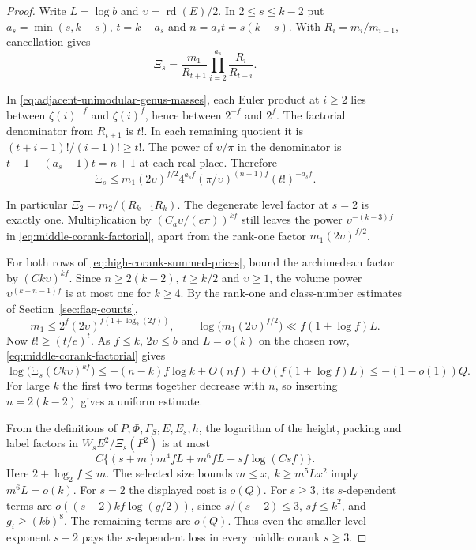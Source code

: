 \begin{proof}
Write \(L=\log b\) and \(\upsilon=\operatorname{rd}(E)/2\). In
\(2\le s\le k-2\) put \(a_s=\min(s,k-s)\), \(t=k-a_s\) and
\(n=a_st=s(k-s)\). With \(R_i=m_i/m_{i-1}\), cancellation gives
\[
 \Xi_s=\frac{m_1}{R_{t+1}}\prod_{i=2}^{a_s}\frac{R_i}{R_{t+i}} .
\]

In \eqref{eq:adjacent-unimodular-genus-masses}, each Euler product
at \(i\ge2\) lies between \(\zeta(i)^{-f}\) and \(\zeta(i)^f\),
hence between \(2^{-f}\) and \(2^f\).
The factorial denominator from \(R_{t+1}\) is \(t!\). In each
remaining quotient it is \((t+i-1)!/(i-1)!\ge t!\).
The power of \(\upsilon/\pi\) in the denominator is
\(t+1+(a_s-1)t=n+1\) at each real place. Therefore
\begin{equation}\label{eq:middle-corank-factorial}
 \Xi_s\le m_1(2\upsilon)^{f/2}4^{a_sf}
               (\pi/\upsilon)^{(n+1)f}(t!)^{-a_sf}.
\end{equation}

In particular \(\Xi_2=m_2/(R_{k-1}R_k)\). The degenerate level
factor at \(s=2\) is exactly one. Multiplication by
\((C_a\upsilon/(e\pi))^{kf}\) still leaves the power
\(\upsilon^{-(k-3)f}\) in \eqref{eq:middle-corank-factorial},
apart from the rank-one factor \(m_1(2\upsilon)^{f/2}\).

For both rows of \eqref{eq:high-corank-summed-prices}, bound the
archimedean factor by \((Ck\upsilon)^{kf}\).
Since \(n\ge2(k-2)\), \(t\ge k/2\) and \(\upsilon\ge1\), the volume
power \(\upsilon^{(k-n-1)f}\) is at most one for \(k\ge4\).
By the rank-one and class-number estimates of
Section~\ref{sec:flag-counts},
\[
 m_1\le2^f(2\upsilon)^{f(1+\log_2(2f))},\qquad
 \log\!\big(m_1(2\upsilon)^{f/2}\big)\ll f(1+\log f)L .
\]
Now \(t!\ge(t/e)^t\). As \(f\le k\), \(2\upsilon\le b\) and
\(L=o(k)\) on the chosen row, \eqref{eq:middle-corank-factorial} gives
\[
 \log\!\big(\Xi_s(Ck\upsilon)^{kf}\big)
 \le -(n-k)f\log k+O(nf)+O(f(1+\log f)L)
 \le -(1-o(1))Q .
\]
For large \(k\) the first two terms together decrease
with \(n\), so inserting \(n=2(k-2)\) gives a uniform estimate.

From the definitions of \(P,\Phi,\Gamma_S,E,E_s,h\),
the logarithm of the height, packing and label factors in
\(W_s E^2/\Xi_s(P^2)\) is at most
\[
 C\{(s+m)m^4 fL+m^6fL+sf\log(Csf)\}.
\]
Here \(2+\log_2 f\le m\). The selected size bounds
\(m\le x,\ k\ge m^5Lx^2\) imply \(m^6L=o(k)\).
For \(s=2\) the displayed cost is \(o(Q)\).
For \(s\ge3\), its \(s\)-dependent terms are
\(o((s-2)kf\log(g/2))\), since \(s/(s-2)\le3\),
\(sf\le k^2\), and \(g_i\ge(kb)^8\). The remaining terms are \(o(Q)\).
Thus even the smaller level exponent \(s-2\) pays the
\(s\)-dependent loss in every middle corank \(s\ge3\).


\end{proof}
